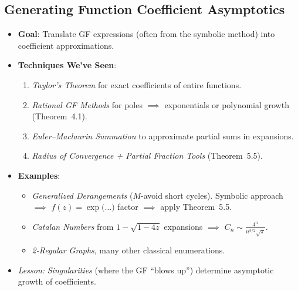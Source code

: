 \documentclass[11pt,letterpaper]{article}
\begin{document}
\subsection{Generating Function Coefficient Asymptotics}
\begin{itemize}
  \item \textbf{Goal}: Translate GF expressions (often from the symbolic method) into coefficient approximations.
  \item \textbf{Techniques We’ve Seen}:
    \begin{enumerate}
      \item \emph{Taylor’s Theorem} for exact coefficients of entire functions.
      \item \emph{Rational GF Methods} for poles $\implies$ exponentials or polynomial growth (Theorem~4.1).
      \item \emph{Euler--Maclaurin Summation} to approximate partial sums in expansions.
      \item \emph{Radius of Convergence + Partial Fraction Tools} (Theorem~5.5).
    \end{enumerate}
  \item \textbf{Examples}:
    \begin{itemize}
      \item \emph{Generalized Derangements} ($M$-avoid short cycles). Symbolic approach $\implies$ $f(z)=\exp\bigl(\dots\bigr)$ factor $\implies$ apply Theorem~5.5.
      \item \emph{Catalan Numbers} from $1-\sqrt{1-4z}$ expansions $\implies$ $C_n\sim\frac{4^n}{n^{3/2}\sqrt{\pi}}$.
      \item \emph{2-Regular Graphs}, many other classical enumerations.
    \end{itemize}
  \item \emph{Lesson:} \emph{Singularities} (where the GF “blows up”) determine asymptotic growth of coefficients.
\end{itemize}

\end{document}
